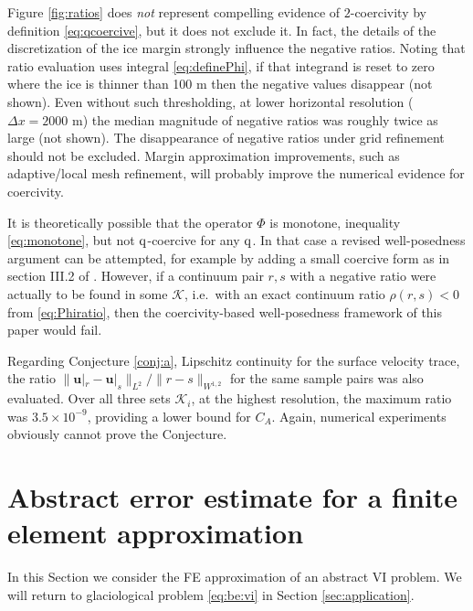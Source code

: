 \documentclass[hidelinks,onefignum,onetabnum,final]{siamart220329}  %
\newcommand{\bu}{\mathbf{u}}
\newcommand{\cK}{\mathcal{K}}
\newcommand{\qq}{{\text{\textnormal{q}}}}
\begin{document}
Figure \ref{fig:ratios} does \emph{not} represent compelling evidence of $2$-coercivity by definition \eqref{eq:qcoercive}, but it does not exclude it.  In fact, the details of the discretization of the ice margin strongly influence the negative ratios.  Noting that ratio evaluation uses integral \eqref{eq:definePhi}, if that integrand is reset to zero where the ice is thinner than 100 m then the negative values disappear (not shown).  Even without such thresholding, at lower horizontal resolution ($\Delta x=2000$ m) the median magnitude of negative ratios was roughly twice as large (not shown).  The disappearance of negative ratios under grid refinement should not be excluded.  Margin approximation improvements, such as adaptive/local mesh refinement, will probably improve the numerical evidence for coercivity.

It is theoretically possible that the operator $\Phi$ is monotone, inequality \eqref{eq:monotone}, but not $\qq$-coercive for any $\qq$.  In that case a revised well-posedness argument can be attempted, for example by adding a small coercive form as in section III.2 of \cite{KinderlehrerStampacchia1980}.  However, if a continuum pair $r,s$ with a negative ratio were actually to be found in some $\cK$, i.e.~with an exact continuum ratio $\rho(r,s)<0$ from \eqref{eq:Phiratio}, then the coercivity-based well-posedness framework of this paper would fail.

Regarding Conjecture \ref{conj:a}, Lipschitz continuity for the surface velocity trace, the ratio $\big\|\bu|_r - \bu|_s\big\|_{L^2}/\|r-s\|_{W^{1,2}}$ for the same sample pairs was also evaluated.  Over all three sets $\cK_i$, at the highest resolution, the maximum ratio was $3.5\times 10^{-9}$, providing a lower bound for $C_A$.  Again, numerical experiments obviously cannot prove the Conjecture.


\section{Abstract error estimate for a finite element approximation} \label{sec:abstractestimate}

In this Section we consider the FE approximation of an abstract VI problem.  We will return to glaciological problem \eqref{eq:be:vi} in Section \ref{sec:application}.
\end{document}
